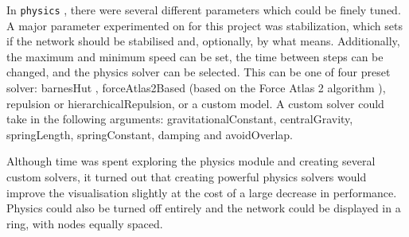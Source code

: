 \documentclass[../dissertation.tex]{subfiles}
\begin{document}
In \texttt{physics} \cite{visjsphysics}, there were several different parameters which could be finely tuned. A major parameter experimented on for this project was stabilization, which sets if the network should be stabilised and, optionally, by what means. Additionally, the maximum and minimum speed can be set, the time between steps can be changed, and the physics solver can be selected. This can be one of four preset solver: barnesHut \cite{barnes1986hierarchical}, forceAtlas2Based (based on the Force Atlas 2 algorithm \cite{jacomy2014forceatlas2}), repulsion or hierarchicalRepulsion, or a custom model. A custom solver could take in the following arguments: gravitationalConstant, centralGravity, springLength, springConstant, damping and avoidOverlap. 

Although time was spent exploring the physics module and creating several custom solvers, it turned out that creating powerful physics solvers would improve the visualisation slightly at the cost of a large decrease in performance. Physics could also be turned off entirely and the network could be displayed in a ring, with nodes equally spaced. 
\end{document}
